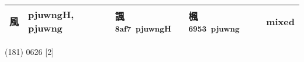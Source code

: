 \documentclass[14pt,a4paper]{scrartcl}
\begin{document}
\begin{longtable}[c]{@{}llllll@{}}
\begin{minipage}[t]{0.14\columnwidth}\raggedright\strut
風
\strut\end{minipage} &
\begin{minipage}[t]{0.14\columnwidth}\raggedright\strut
pjuwngH, pjuwng
\strut\end{minipage} &
\begin{minipage}[t]{0.14\columnwidth}\raggedright\strut
諷\textsuperscript{8af7~pjuwngH}
\strut\end{minipage} &
\begin{minipage}[t]{0.14\columnwidth}\raggedright\strut
楓\textsuperscript{6953~pjuwng}
\strut\end{minipage} &
\begin{minipage}[t]{0.14\columnwidth}\raggedright\strut
\strut\end{minipage} &
\begin{minipage}[t]{0.14\columnwidth}\raggedright\strut
mixed
\strut\end{minipage}\tabularnewline
\bottomrule
\end{longtable}

(181) 0626 {[}2{]}
\end{document}
